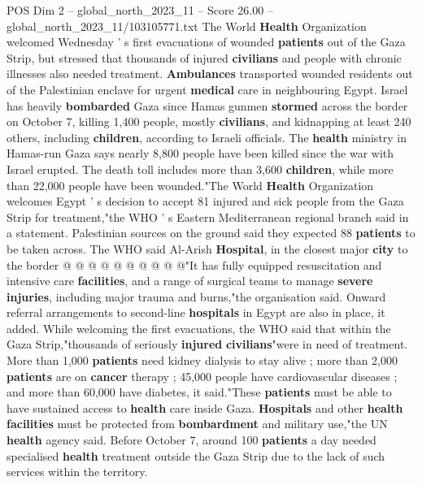 \begin{textsample}{POS Dim 2 – global\_north\_2023\_11 – Score 26.00 – global\_north\_2023\_11/103105771.txt}  \label{ex:f2_pos_239}
The World \textbf{Health} Organization welcomed Wednesday ' s first evacuations of wounded \textbf{patients} out of the Gaza Strip, but stressed that thousands of injured \textbf{civilians} and people with chronic illnesses also needed treatment. \textbf{Ambulances} transported wounded residents out of the Palestinian enclave for urgent \textbf{medical} care in neighbouring Egypt.
Israel has heavily \textbf{bombarded} Gaza since Hamas gunmen \textbf{stormed} across the border on October 7, killing 1,400 people, mostly \textbf{civilians}, and kidnapping at least 240 others, including \textbf{children}, according to Israeli officials.
The \textbf{health} ministry in Hamas-run Gaza says nearly 8,800 people have been killed since the war with Israel erupted.
The death toll includes more than 3,600 \textbf{children}, while more than 22,000 people have been wounded."The World \textbf{Health} Organization welcomes Egypt ' s decision to accept 81 injured and sick people from the Gaza Strip for treatment,"the WHO ' s Eastern Mediterranean regional branch said in a statement.
Palestinian sources on the ground said they expected 88 \textbf{patients} to be taken across.
The WHO said Al-Arish \textbf{Hospital}, in the closest major \textbf{city} to the border @ @ @ @ @ @ @ @ @ @"It has fully equipped resuscitation and intensive care \textbf{facilities}, and a range of surgical teams to manage \textbf{severe} \textbf{injuries}, including major trauma and burns,"the organisation said.
Onward referral arrangements to second-line \textbf{hospitals} in Egypt are also in place, it added.
While welcoming the first evacuations, the WHO said that within the Gaza Strip,"thousands of seriously \textbf{injured} \textbf{civilians}"were in need of treatment.
More than 1,000 \textbf{patients} need kidney dialysis to stay alive ; more than 2,000 \textbf{patients} are on \textbf{cancer} therapy ; 45,000 people have cardiovascular diseases ; and more than 60,000 have diabetes, it said."These \textbf{patients} must be able to have sustained access to \textbf{health} care inside Gaza. \textbf{Hospitals} and other \textbf{health} \textbf{facilities} must be protected from \textbf{bombardment} and military use,"the UN \textbf{health} agency said.
Before October 7, around 100 \textbf{patients} a day needed specialised \textbf{health} treatment outside the Gaza Strip due to the lack of such services within the territory.

\end{textsample}

